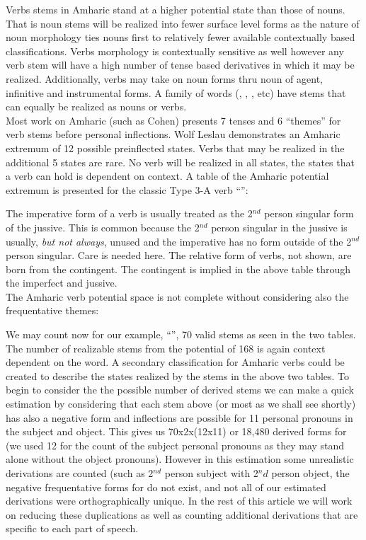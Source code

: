 \documentclass[a4paper]{report}
\begin{document}
Verbs stems in Amharic stand at a higher potential state than those of nouns.  That is noun stems will be realized into fewer surface level forms as the nature of noun morphology ties nouns first to relatively fewer available contextually based classifications.  Verbs morphology is contextually sensitive as well however any verb stem will have a high number of tense based derivatives in which it may be realized.  Additionally, verbs may take on noun forms thru noun of agent, infinitive and instrumental forms.  A family of words ({\sseG}{\raG}, {\fG}{\qG}{\rG}, {\leG}{\bG}{\sG}, etc) have stems that can equally be realized as nouns or verbs. \\

Most work on Amharic (such as Cohen) presents 7 tenses and 6 ``themes'' for verb stems before personal inflections.  Wolf Leslau demonstrates an Amharic extremum of 12 possible preinflected states.  Verbs that may be realized in the additional 5 states are rare.  No verb will be realized in all states, the states that a verb can hold is dependent on context.  A table of the Amharic potential extremum is presented for the classic Type 3-A verb ``{\neG}{\geG}{\rG}'':



The imperative form of a verb is usually treated as the 2$^{nd}$ person singular form of the jussive.  This is common because the 2$^{nd}$ person singular in the jussive is usually, \emph{but not always}, unused and the imperative has no form outside of the 2$^{nd}$ person singular.  Care is needed here.  The relative form of verbs, not shown, are born from the contingent.  The contingent is implied in the above table through the imperfect and jussive.\\

The Amharic verb potential space is not complete without considering also the frequentative themes:



We may count now for our example, ``{\neG}{\geG}{\reG}'', 70 valid stems as seen in the two tables.  The number of realizable stems from the potential of 168 is again context dependent on the word.  A secondary classification for Amharic verbs could be created to describe the states realized by the stems in the above two tables.  To begin to consider the the possible number of derived stems we can make a quick estimation by considering that each stem above (or most as we shall see shortly) has also a negative form and inflections are possible for 11 personal pronouns in the subject and object.  This gives us 70x2x(12x11) or 18,480 derived forms for {\neG}{\geG}{\reG} (we used 12 for the count of the subject personal pronouns as they may stand alone without the object pronouns).  However in this estimation some unrealistic derivations are counted (such as 2$^{nd}$ person subject with 2${^nd}$ person object, the negative frequentative forms for {\neG}{\geG}{\reG} do not exist, and not all of our estimated derivations were orthographically unique.  In the rest of this article we will work on reducing these duplications as well as counting additional derivations that are specific to each part of speech.\\
\end{document}
